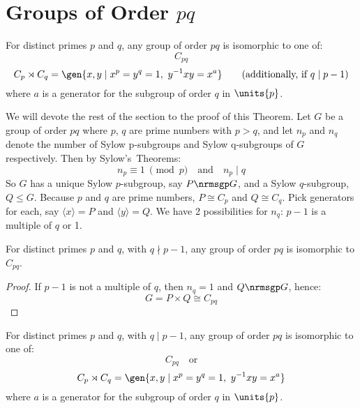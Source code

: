 \section{Groups of Order \(pq\)}
\begin{theorem}\label{thm:pq}
    For distinct primes \(p\) and \(q\), any group of order \(pq\) is isomorphic to one of:
    \[C_{pq}\]
    \[C_{p} \rtimes C_{q} = \gen{x, y \mid x^p = y^q = 1,\ y^{-1}xy = x^a} \tag{additionally, if \(q \mid p-1\)}\]
    where \(a\) is a generator for the subgroup of order \(q\) in \(\units{p}\).
\end{theorem}

We will devote the rest of the section to the proof of this Theorem.
Let \(G\) be a group of order \(pq\) where \(p\), \(q\) are prime numbers with \(p > q\), and let \(n_p\) and \(n_q\)
denote the number of Sylow p-subgroups and Sylow q-subgroups of \(G\) respectively.
Then by Sylow's~Theorems:
\[n_p \equiv 1 \ \pmod{p} \quad \text{and} \quad n_p \mid q\]
So \(G\) has a unique Sylow \(p\)-subgroup, say \(P \nrmsgp G\), and a Sylow \(q\)-subgroup, \(Q \leqslant G\).
Because \(p\) and \(q\) are prime numbers, \(P \cong C_p\) and \(Q \cong C_q\).
Pick generators for each, say \(\langle x \rangle  = P\) and \(\langle y \rangle = Q\).
We have 2 possibilities for \(n_q\): \(p-1\) is a multiple of \(q\) or 1.

\begin{lemma}
    For distinct primes \(p\) and \(q\), with \(q \nmid p-1\), any group of order \(pq\) is isomorphic to \(C_{pq}\).
\end{lemma}

\begin{proof}
    If \(p-1\) is not a multiple of \(q\), then \(n_q = 1\) and \(Q \nrmsgp G\), hence:
    \[G = P \times Q \cong C_{pq}\]
\end{proof}

\begin{lemma}
    For distinct primes \(p\) and \(q\), with \(q \mid p-1\), any group of order \(pq\) is isomorphic to one of:
    \[C_{pq} \quad \text{or}\]
    \[C_{p} \rtimes C_{q} = \gen{x, y \mid x^p = y^q = 1,\ y^{-1}xy = x^a}\]
    where \(a\) is a generator for the subgroup of order \(q\) in \(\units{p}\).
\end{lemma}

